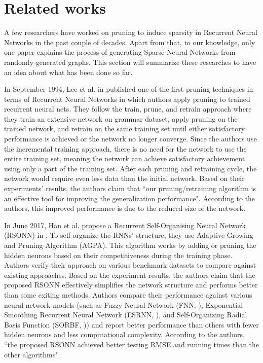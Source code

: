 \chapter{Related works}\label{chap:literature}

A few researchers have worked on pruning to induce sparsity in Recurrent Neural Networks in the past couple of decades. Apart from that, to our knowledge, only one paper explains the process of generating Sparse Neural Networks from randomly generated graphs. This section will summarize these researches to have an idea about what has been done so far.

In September 1994, Lee et al. in \cite{lee_pruning} published one of the first pruning techniques in terms of Recurrent Neural Networks in which authors apply pruning to trained recurrent neural nets. They follow the train, prune, and retrain approach where they train an extensive network on grammar dataset, apply pruning on the trained network, and retrain on the same training set until either satisfactory performance is achieved or the network no longer converge. Since the authors use the incremental training approach, there is no need for the network to use the entire training set, meaning the network can achieve satisfactory achievement using only a part of the training set. After each pruning and retraining cycle, the network would require even less data than the initial network. Based on their experiments' results, the authors claim that ``our pruning/retraining algorithm is an effective tool for improving the generalization performance". According to the authors, this improved performance is due to the reduced size of the network.

In June 2017, Han et al. propose a Recurrent Self-Organising Neural Network (RSONN) in \cite{han_pruning}. To self-organize the RNNs' structure, they use Adaptive Growing and Pruning Algorithm (AGPA). This algorithm works by adding or pruning the hidden neurons based on their competitiveness during the training phase. Authors verify their approach on various benchmark datasets to compare against existing approaches. Based on the experiment results, the authors claim that the proposed RSONN effectively simplifies the network structure and performs better than some exiting methods. Authors compare their performance against various neural network models (such as Fuzzy Neural Network (FNN, \cite{han-why}), Exponential Smoothing Recurrent Neural Network (ESRNN, \cite{esrnn}), and Self-Organizing Radial Basis Function (SORBF, \cite{han-again-why})) and report better performance than others with fewer hidden neurons and less computational complexity. According to the authors, ``the proposed RSONN achieved better testing RMSE and running times than the other algorithms".

